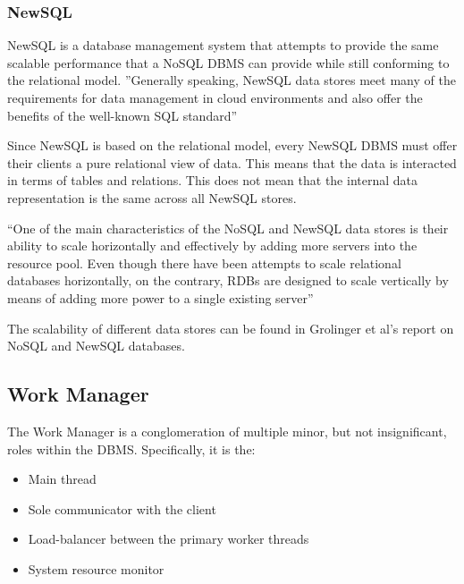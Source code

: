 \documentclass[letterpaper, 12pt]{article}
\begin{document}
\subsubsection{NewSQL}
NewSQL is a database management system that attempts to provide
the same scalable performance that a NoSQL DBMS can provide while still conforming to
the relational model. ''Generally speaking, NewSQL data stores meet many of the
requirements for data management in cloud environments and also offer the benefits of
the well-known SQL standard''\cite{grolinger2013data}
\par\vspace{\baselineskip}
Since NewSQL is based on the relational model, every NewSQL DBMS must offer their clients
a pure relational view of data. This means that the data is interacted in terms of tables
and relations. This does not mean that the internal data representation is the same across
all NewSQL stores.
\par\vspace{\baselineskip}
``One of the main characteristics of the NoSQL and NewSQL data stores is their ability to
scale horizontally and effectively by adding more servers into the resource pool. Even
though there have been attempts to scale relational databases horizontally, on the contrary,
RDBs are designed to scale vertically by means of adding more power to a single existing
server''\cite{grolinger2013data}
\par\vspace{\baselineskip}
The scalability of different data stores can be found in Grolinger et al's 
report on NoSQL and NewSQL databases\cite{grolinger2013data}.

\newpage

\subsection{Work Manager}
The Work Manager is a conglomeration of multiple minor, but not insignificant, roles
within the DBMS. Specifically, it is the:
\begin{itemize}
  \item Main thread
  \item Sole communicator with the client
  \item Load-balancer between the primary worker threads
  \item System resource monitor
\end{itemize}
\end{document}
